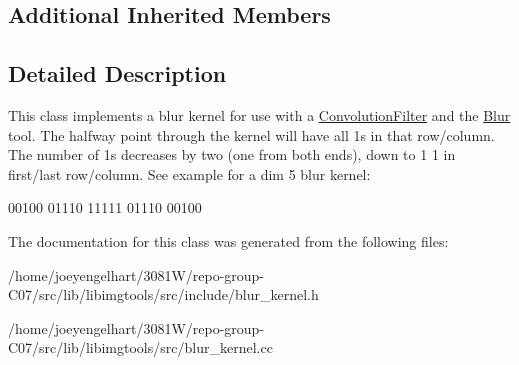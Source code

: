 \subsection*{Additional Inherited Members}


\subsection{Detailed Description}
This class implements a blur kernel for use with a \hyperlink{classimage__tools_1_1ConvolutionFilter}{Convolution\+Filter} and the \hyperlink{classimage__tools_1_1Blur}{Blur} tool. The halfway point through the kernel will have all 1\textquotesingle{}s in that row/column. The number of 1\textquotesingle{}s decreases by two (one from both ends), down to 1 1 in first/last row/column. See example for a dim 5 blur kernel\+: 

00100 01110 11111 01110 00100 

The documentation for this class was generated from the following files\+:\begin{DoxyCompactItemize}
\item 
/home/joeyengelhart/3081\+W/repo-\/group-\/\+C07/src/lib/libimgtools/src/include/blur\+\_\+kernel.\+h\item 
/home/joeyengelhart/3081\+W/repo-\/group-\/\+C07/src/lib/libimgtools/src/blur\+\_\+kernel.\+cc\end{DoxyCompactItemize}
